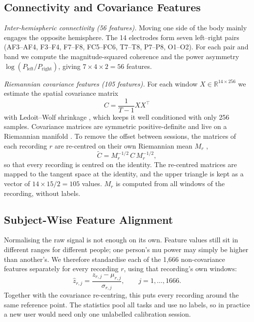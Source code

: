 \documentclass[pdflatex,sn-mathphys-num]{sn-jnl}%
\theoremstyle{thmstyleone}%
\theoremstyle{thmstyletwo}%
\theoremstyle{thmstylethree}%
\begin{document}
\subsection{Connectivity and Covariance Features}\label{subsec:conn}

\emph{Inter-hemispheric connectivity (56 features).} Moving one side of the body mainly engages the opposite hemisphere. The 14 electrodes form seven left--right pairs (AF3--AF4, F3--F4, F7--F8, FC5--FC6, T7--T8, P7--P8, O1--O2). For each pair and band we compute the magnitude-squared coherence and the power asymmetry $\log(P_{\mathrm{left}}/P_{\mathrm{right}})$, giving $7 \times 4 \times 2 = 56$ features.

\emph{Riemannian covariance features (105 features).} For each window $X \in \mathbb{R}^{14 \times 256}$ we estimate the spatial covariance matrix
\begin{equation}
C = \frac{1}{T - 1} X X^{\top}
\end{equation}
with Ledoit--Wolf shrinkage \citep{LedoitWolf2004}, which keeps it well conditioned with only 256 samples. Covariance matrices are symmetric positive-definite and live on a Riemannian manifold \citep{Barachant2012}. To remove the offset between sessions, the matrices of each recording $r$ are re-centred on their own Riemannian mean $M_r$ \citep{Zanini2018},
\begin{equation}
\tilde{C} = M_r^{-1/2}\, C\, M_r^{-1/2},
\end{equation}
so that every recording is centred on the identity. The re-centred matrices are mapped to the tangent space at the identity, and the upper triangle is kept as a vector of $14 \times 15 / 2 = 105$ values. $M_r$ is computed from all windows of the recording, without labels.

\subsection{Subject-Wise Feature Alignment}\label{subsec:align}

Normalising the raw signal is not enough on its own. Feature values still sit in different ranges for different people; one person's mu power may simply be higher than another's. We therefore standardise each of the 1,666 non-covariance features separately for every recording $r$, using that recording's own windows:
\begin{equation}
\hat{z}_{r,j} = \frac{z_{r,j} - \mu_{r,j}}{\sigma_{r,j}}, \qquad j = 1, \dots, 1666.
\end{equation}
Together with the covariance re-centring, this puts every recording around the same reference point. The statistics pool all tasks and use no labels, so in practice a new user would need only one unlabelled calibration session.
\end{document}
